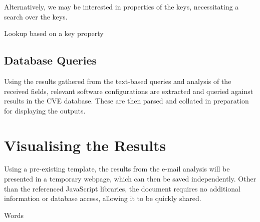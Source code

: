 Alternatively, we may be interested in properties of the keys, necessitating a search over the keys.

\begin{algorithm}
	\caption{Lookup based on a key property}
\end{algorithm}

\subsection{Database Queries}
Using the results gathered from the text-based queries and analysis of the received fields, relevant software configurations are extracted and queried against results in the CVE database.  These are then parsed and collated in preparation for displaying the outputs.

\section{Visualising the Results}
Using a pre-existing template, the results from the e-mail analysis will be presented in a temporary webpage, which can then be saved independently.  Other than the referenced JavaScript libraries, the document requires no additional information or database access, allowing it to be quickly shared.

\begin{algorithm}\caption{Words}
\end{algorithm}
